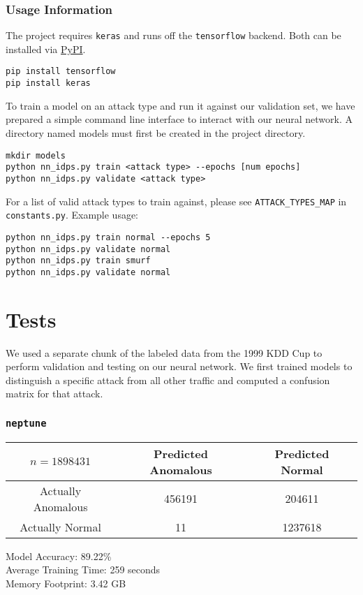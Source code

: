 \documentclass[letterpaper,12pt]{article}
\begin{document}
\subsubsection*{Usage Information}
The project requires \texttt{keras} and runs off the \texttt{tensorflow}
backend. Both can be installed via \href{https://pypi.org/}{PyPI}.
\begin{lstlisting}
pip install tensorflow
pip install keras
\end{lstlisting}
To train a model on an attack type and run it against our validation set, we
have prepared a simple command line interface to interact with our neural
network. A directory named models must first be created in the project
directory.
\begin{lstlisting}
mkdir models
python nn_idps.py train <attack type> --epochs [num epochs]
python nn_idps.py validate <attack type>
\end{lstlisting}
For a list of valid attack types to train against, please see
\texttt{ATTACK\_TYPES\_MAP} in \texttt{constants.py}. Example usage:
\begin{lstlisting}
python nn_idps.py train normal --epochs 5
python nn_idps.py validate normal
python nn_idps.py train smurf
python nn_idps.py validate normal
\end{lstlisting}

\section*{Tests}
We used a separate chunk of the labeled data from the 1999 KDD Cup to perform
validation and testing on our neural network. We first trained models to
distinguish a specific attack from all other traffic and computed a confusion
matrix for that attack.

\subsubsection*{\texttt{neptune}}
\begin{center}
  \begin{tabular}{c|c|c}
    \( n  = 1898431 \) & Predicted Anomalous & Predicted Normal \\
    \hline
    Actually Anomalous & 456191 & 204611 \\
    \hline
    Actually Normal & 11 & 1237618
  \end{tabular}
\end{center}
Model Accuracy: 89.22\% \\
Average Training Time: 259 seconds \\
Memory Footprint: 3.42 GB
\end{document}
